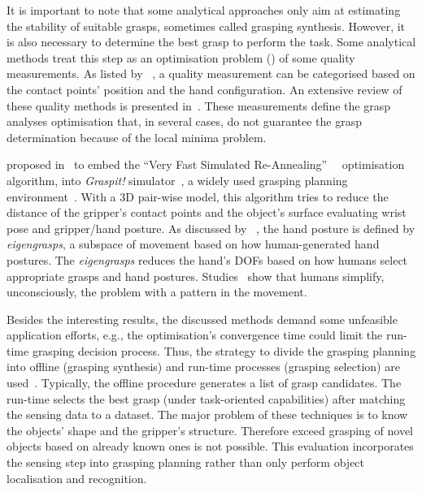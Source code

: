 It is important to note that some analytical approaches only aim at estimating the stability of suitable grasps, sometimes called grasping synthesis. However, it is also necessary to determine the best grasp to perform the task. Some analytical methods treat this step as an optimisation problem (\cite{Ciocarlie2009,rakesh2018optimizing}) of some quality measurements. As listed by \citeauthor{Roa2014}~\cite{Roa2014}, a quality measurement can be categorised based on the contact points' position and the hand configuration. An extensive review of these quality methods is presented in~\cite{Roa2014}. These measurements define the grasp analyses optimisation that, in several cases, do not guarantee the grasp determination because of the local minima problem.


\citeauthor{Ciocarlie2009} proposed in~\cite{Ciocarlie2009} to embed the ``Very Fast Simulated Re-Annealing''~\cite{ingber1988}~\cite{kirkpatrick1983} optimisation algorithm, into \textit{Graspit!} simulator~\cite{AndrewT2004}, a widely used grasping planning environment~\cite{morales2006integrated, carvalho2020}. With a 3D pair-wise model, this algorithm tries to reduce the distance of the gripper's contact points and the object's surface evaluating wrist pose and gripper/hand posture. As discussed by \citeauthor{Ciocarlie2009}~\cite{Ciocarlie2009}, the hand posture is defined by \textit{eigengrasps}, a subspace of movement based on how human-generated hand postures. The \textit{eigengrasps} reduces the hand's DOFs based on how humans select appropriate grasps and hand postures. Studies~\cite{Ciocarlie2009,Santello2002} show that humans simplify, unconsciously, the problem with a pattern in the movement. 

Besides the interesting results, the discussed methods demand some unfeasible application efforts, e.g., the optimisation's convergence time could limit the run-time grasping decision process. Thus, the strategy to divide the grasping planning into offline (grasping synthesis) and run-time processes (grasping selection) are used~\cite{carvalho2020}. Typically, the offline procedure generates a list of grasp candidates. The run-time selects the best grasp (under task-oriented capabilities) after matching the sensing data to a dataset. The major problem of these techniques is to know the objects' shape and the gripper's structure. Therefore exceed grasping of novel objects based on already known ones is not possible. This evaluation incorporates the sensing step into grasping planning rather than only perform object localisation and recognition.

